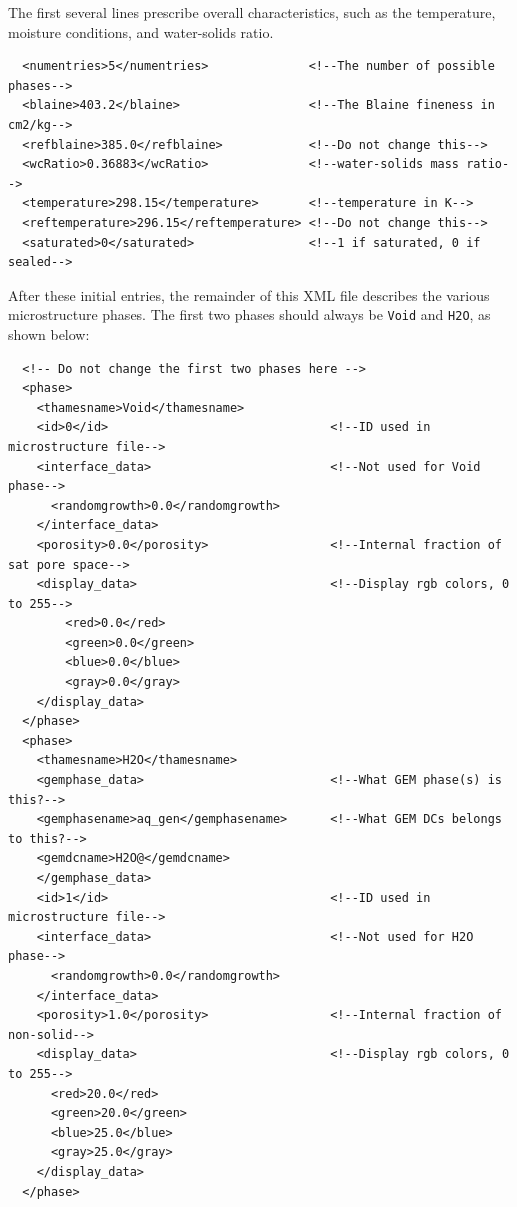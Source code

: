 \documentclass{article}
\begin{document}
The first several lines prescribe overall characteristics, such as the
temperature, moisture conditions, and water-solids ratio.

\scriptsize{
\begin{lstlisting}
  <numentries>5</numentries>              <!--The number of possible phases-->
  <blaine>403.2</blaine>                  <!--The Blaine fineness in cm2/kg-->
  <refblaine>385.0</refblaine>            <!--Do not change this-->
  <wcRatio>0.36883</wcRatio>              <!--water-solids mass ratio-->
  <temperature>298.15</temperature>       <!--temperature in K-->
  <reftemperature>296.15</reftemperature> <!--Do not change this-->
  <saturated>0</saturated>                <!--1 if saturated, 0 if sealed-->
\end{lstlisting}
}

\normalsize{ }

After these initial entries, the remainder of this XML file describes the various
microstructure phases.  The first two phases should always be \verb!Void! and
\verb!H2O!, as shown below:

\scriptsize{
    \begin{lstlisting}
  <!-- Do not change the first two phases here -->
  <phase>
    <thamesname>Void</thamesname>
    <id>0</id>                               <!--ID used in microstructure file-->
    <interface_data>                         <!--Not used for Void phase-->
      <randomgrowth>0.0</randomgrowth>       
    </interface_data>
    <porosity>0.0</porosity>                 <!--Internal fraction of sat pore space-->
    <display_data>                           <!--Display rgb colors, 0 to 255-->
        <red>0.0</red>
        <green>0.0</green>
        <blue>0.0</blue>
        <gray>0.0</gray>
    </display_data>
  </phase>
  <phase>
    <thamesname>H2O</thamesname>             
    <gemphase_data>                          <!--What GEM phase(s) is this?-->
    <gemphasename>aq_gen</gemphasename>      <!--What GEM DCs belongs to this?-->
    <gemdcname>H2O@</gemdcname>
    </gemphase_data>
    <id>1</id>                               <!--ID used in microstructure file-->
    <interface_data>                         <!--Not used for H2O phase-->
      <randomgrowth>0.0</randomgrowth>
    </interface_data>
    <porosity>1.0</porosity>                 <!--Internal fraction of non-solid-->
    <display_data>                           <!--Display rgb colors, 0 to 255-->
      <red>20.0</red>
      <green>20.0</green>
      <blue>25.0</blue>
      <gray>25.0</gray>
    </display_data>
  </phase>
    \end{lstlisting}
}
\end{document}
